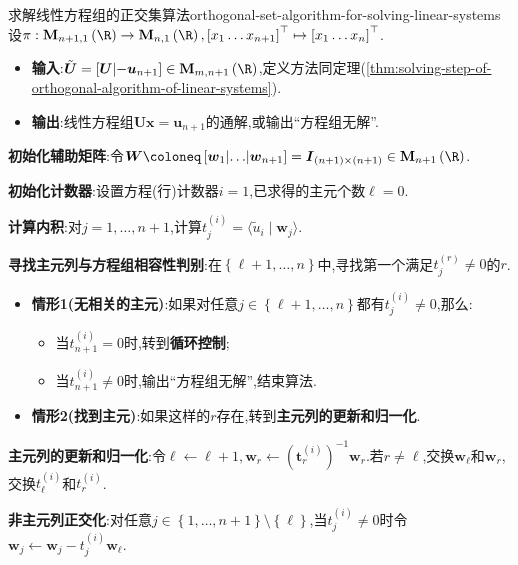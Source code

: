 \begin{algorithm}{求解线性方程组的正交集算法}{orthogonal-set-algorithm-for-solving-linear-systems}
	设$\pi:\mathbf{M}_{n+1,1}\left(\R\right)\to\mathbf{M}_{n,1}\left(\R\right),\left[x_{1}\ldots x_{n+1}\right]^{\top}\mapsto\left[x_{1}\ldots x_{n}\right]^{\top}$.
	\begin{itemize}
		\item \textbf{输入}:$\tilde{\boldsymbol{U}}=\left[\boldsymbol{U}\middle|-\boldsymbol{u}_{n+1}\right]\in\mathbf{M}_{m,n+1}\left(\R\right)$,定义方法同定理(\ref{thm:solving-step-of-orthogonal-algorithm-of-linear-systems}).
		\item \textbf{输出}:线性方程组$\boldsymbol{U}\boldsymbol{x}=\boldsymbol{u}_{n+1}$的通解,或输出``方程组无解''.
	\end{itemize}
	\textbf{初始化辅助矩阵}:令$\boldsymbol{W}\coloneq\left[\boldsymbol{w}_{1}\middle|\ldots\middle|\boldsymbol{w}_{n+1}\right]=\boldsymbol{I}_{\left(n+1\right)\times\left(n+1\right)}\in\mathbf{M}_{n+1}\left(\R\right)$.
	
	\textbf{初始化计数器}:设置方程(行)计数器$i=1$,已求得的主元个数$\ell=0$.
	
	\textbf{计算内积}:对$j=1,\ldots,n+1$,计算$t_{j}^{\left(i\right)}=\langle\tilde{u}_{i}\mid\boldsymbol{w}_{j}\rangle$.
	
	\textbf{寻找主元列与方程组相容性判别}:在$\left\{\ell+1,\ldots,n\right\}$中,寻找第一个满足$t_{j}^{\left(r\right)}\neq 0$的$r$.
	\begin{itemize}
		\item \textbf{情形1(无相关的主元)}:如果对任意$j\in\left\{\ell+1,\ldots,n\right\}$都有$t_{j}^{\left(i\right)}\neq 0$,那么:
		\begin{itemize}
			\item 当$t_{n+1}^{\left(i\right)}=0$时,转到\textbf{循环控制};
			\item 当$t_{n+1}^{\left(i\right)}\neq 0$时,输出``方程组无解'',结束算法.
		\end{itemize}
		\item \textbf{情形2(找到主元)}:如果这样的$r$存在,转到\textbf{主元列的更新和归一化}.
	\end{itemize}
	
	\textbf{主元列的更新和归一化}:令$\ell\leftarrow\ell+1,\boldsymbol{w}_{r}\leftarrow\left(\boldsymbol{t}_{r}^{\left(i\right)}\right)^{-1}\boldsymbol{w}_{r}$.若$r\neq\ell$,交换$\boldsymbol{w}_{\ell}$和$\boldsymbol{w}_{r}$,交换$t_{\ell}^{\left(i\right)}$和$t_{r}^{\left(i\right)}$.
	
	\textbf{非主元列正交化}:对任意$j\in\left\{1,\ldots,n+1\right\}\setminus\left\{\ell\right\}$,当$t_{j}^{\left(i\right)}\neq 0$时令$\boldsymbol{w}_{j}\leftarrow\boldsymbol{w}_{j}-t_{j}^{\left(i\right)}\boldsymbol{w}_{\ell}$.
\end{algorithm}
